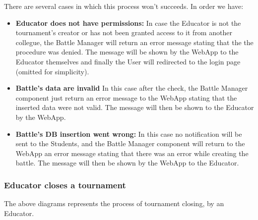 \documentclass{article}
\begin{document}
{        There are several cases in which this process won't succeeds. In order we have:
        \begin{itemize}
            \item \textbf{Educator does not have permissions:} In case the Educator is not the 
            tournament's creator or has not been granted access to it from another collegue, 
            the Battle Manager will return an error message stating that the the procedure was 
            denied. 
            The message will be shown by the WebApp to the Educator themselves and finally
            the User will redirected to the login page (omitted for simplicity).
            \item \textbf{Battle's data are invalid} In this case after the check, the Battle 
            Manager component just return an error message to the WebApp stating that the 
            inserted data were not valid. The message will then be shown to the Educator by 
            the WebApp.
            \item \textbf{Battle's DB insertion went wrong:} In this case no 
            notification will be sent to the Students, and the Battle Manager component will 
            return to the WebApp an error message stating that there was an error while 
            creating the battle.
            The message will then be shown by the WebApp to the Educator.
        \end{itemize}


    \subsubsection{Educator closes a tournament}
        \begin{figure}[H]
            \centering
            \caption{}
            \label{fig:}
        \end{figure}

        The above diagrams represents the process of tournament closing, by an Educator. \\
}
\end{document}
